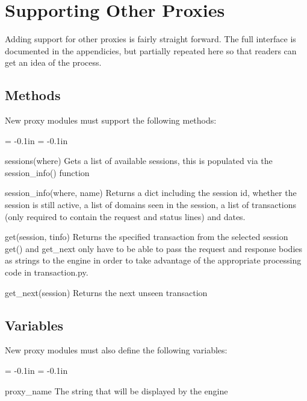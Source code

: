 \documentclass{article}
\newenvironment{mindesc}{\begin{description}\parsep = -0.1in \itemsep = -0.1in}{\end{description}}
\begin{document}
\section{Supporting Other Proxies}
Adding support for other proxies is fairly straight forward.  The full interface is
documented in the appendicies, but partially repeated here so that readers can get
an idea of the process.
\subsection{Methods}
New proxy modules must support the following methods:
\begin{mindesc}
\item[sessions(where)] Gets a list of available sessions, this is populated via the session\_info() function
\item[session\_info(where, name)] Returns a dict including the session id, whether the session is still active, a list of domains seen in the session, a list of transactions (only required to contain the request and status lines) and dates.
\item[get(session, tinfo)] Returns the specified transaction from the selected session\\
get() and get\_next only have to be able to pass the request and response bodies as strings 
to the engine in order to take advantage of the appropriate processing code in transaction.py.
\item[get\_next(session)] Returns the next unseen transaction
\end{mindesc}

\subsection{Variables}
New proxy modules must also define the following variables:
\begin{mindesc}
\item[proxy\_name] The string that will be displayed by the engine
\end{mindesc}

\pagebreak
\appendix






\printindex
\end{document}
